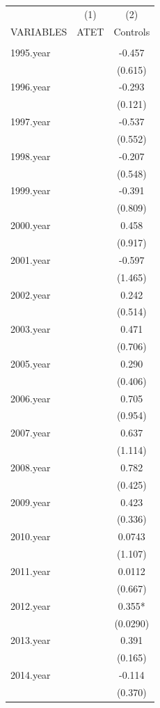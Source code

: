 \begin{table}[H]
\centering
\tiny{
\begin{tabular}{lcc} \hline
 & (1) & (2) \\
VARIABLES & ATET & Controls \\ \hline
 &  &  \\
1995.year &  & -0.457 \\
 &  & (0.615) \\
1996.year &  & -0.293 \\
 &  & (0.121) \\
1997.year &  & -0.537 \\
 &  & (0.552) \\
1998.year &  & -0.207 \\
 &  & (0.548) \\
1999.year &  & -0.391 \\
 &  & (0.809) \\
2000.year &  & 0.458 \\
 &  & (0.917) \\
2001.year &  & -0.597 \\
 &  & (1.465) \\
2002.year &  & 0.242 \\
 &  & (0.514) \\
2003.year &  & 0.471 \\
 &  & (0.706) \\
2005.year &  & 0.290 \\
 &  & (0.406) \\
2006.year &  & 0.705 \\
 &  & (0.954) \\
2007.year &  & 0.637 \\
 &  & (1.114) \\
2008.year &  & 0.782 \\
 &  & (0.425) \\
2009.year &  & 0.423 \\
 &  & (0.336) \\
2010.year &  & 0.0743 \\
 &  & (1.107) \\
2011.year &  & 0.0112 \\
 &  & (0.667) \\
2012.year &  & 0.355* \\
 &  & (0.0290) \\
2013.year &  & 0.391 \\
 &  & (0.165) \\
2014.year &  & -0.114 \\
 &  & (0.370) \\

\end{tabular}}
\end{table}
